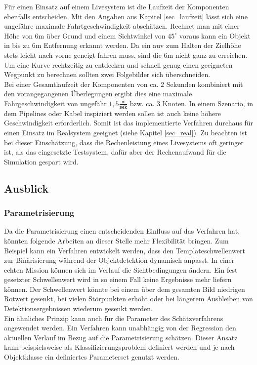 Für einen Einsatz auf einem Livesystem ist die Laufzeit der Komponenten ebenfalls entscheiden. Mit den Angaben aus Kapitel \ref{sec_laufzeit} lässt sich eine ungefähre maximale Fahrtgeschwindigkeit abschätzen. Rechnet man mit einer Höhe von $6$m über Grund und einem Sichtwinkel von $45^\circ$ voraus kann ein Objekt in bis zu $6$m Entfernung erkannt werden. Da ein \gls{auv} zum Halten der Zielhöhe stets leicht nach vorne geneigt fahren muss, sind die $6$m nicht ganz zu erreichen. Um eine Kurve rechtzeitig zu entdecken und schnell genug einen geeigneten Wegpunkt zu berechnen sollten zwei Folgebilder sich überschneiden.\\
Bei einer Gesamtlaufzeit der Komponenten von ca. $2$ Sekunden kombiniert mit den vorangegangenen Überlegungen ergibt dies eine maximale Fahrgeschwindigkeit von ungefähr $1,5 \frac{\texttt{m}}{\texttt{sek}}$ bzw. ca. $3$ Knoten. In einem Szenario, in dem Pipelines oder Kabel inspiziert werden sollen ist auch keine höhere Geschwindigkeit erforderlich. Somit ist das implementierte Verfahren durchaus für einen Einsatz im Realsystem geeignet (siehe Kapitel \ref{sec_real}). Zu beachten ist bei dieser Einschätzung, dass die Rechenleistung eines Livesystems oft geringer ist, als das eingesetzte Testsystem, dafür aber der Rechenaufwand für die Simulation gespart wird.

\subsection{Ausblick}

\subsubsection{Parametrisierung}
Da die Parametrisierung einen entscheidenden Einfluss auf das Verfahren hat, könnten folgende Arbeiten an dieser Stelle mehr Flexibilität bringen. Zum Beispiel kann ein Verfahren entwickelt werden, dass den Templateschwellenwert zur Binärisierung während der Objektdetektion dynamisch anpasst. In einer echten Mission können sich im Verlauf die Sichtbedingungen ändern. Ein fest gesetzter Schwellenwert wird in so einem Fall keine Ergebnisse mehr liefern können. Der Schwellenwert könnte bei einem über dem gesamten Bild niedrigen Rotwert gesenkt, bei vielen Störpunkten erhöht oder bei längerem Ausbleiben von Detektionsergebnissen wiederum gesenkt werden.\\

Ein ähnliches Prinzip kann auch für die Parameter des Schätzverfahrens angewendet werden. Ein Verfahren kann unabhängig von der Regression den aktuellen Verlauf im Bezug auf die Parametrisierung schätzen. Dieser Ansatz kann beispielsweise als Klassifizierungsproblem definiert werden und je nach Objektklasse ein definiertes Parameterset genutzt werden.


